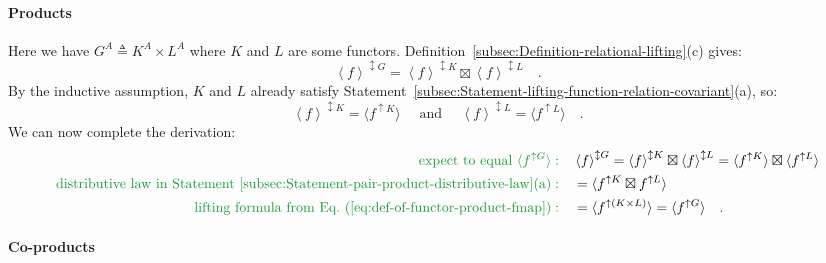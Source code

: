\paragraph{Products}

Here we have $G^{A}\triangleq K^{A}\times L^{A}$ where $K$ and $L$
are some functors. Definition~\ref{subsec:Definition-relational-lifting}(c)
gives:
\[
\left<f\right>^{\updownarrow G}=\left<f\right>^{\updownarrow K}\boxtimes\left<f\right>^{\updownarrow L}\quad.
\]
By the inductive assumption, $K$ and $L$ already satisfy Statement~\ref{subsec:Statement-lifting-function-relation-covariant}(a),
so:
\begin{equation}
\left<f\right>^{\updownarrow K}=\langle f^{\uparrow K}\rangle\quad\text{ and }\quad\left<f\right>^{\updownarrow L}=\langle f^{\uparrow L}\rangle\quad.\label{eq:inductive-assumption-k-l-function-lifting}
\end{equation}
We can now complete the derivation:
\begin{align*}
{\color{greenunder}\text{expect to equal }\langle f^{\uparrow G}\rangle:}\quad & \left<f\right>^{\updownarrow G}=\left<f\right>^{\updownarrow K}\boxtimes\left<f\right>^{\updownarrow L}=\langle f^{\uparrow K}\rangle\boxtimes\langle f^{\uparrow L}\rangle\\
{\color{greenunder}\text{distributive law in Statement~\ref{subsec:Statement-pair-product-distributive-law}(a)}:}\quad & =\langle f^{\uparrow K}\boxtimes f^{\uparrow L}\rangle\\
{\color{greenunder}\text{lifting formula from Eq.~(\ref{eq:def-of-functor-product-fmap})}:}\quad & =\langle f^{\uparrow(K\times L)}\rangle=\langle f^{\uparrow G}\rangle\quad.
\end{align*}


\paragraph{Co-products}

